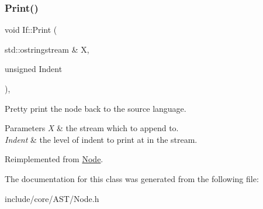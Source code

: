 \subsubsection{\texorpdfstring{Print()}{Print()}}
{\footnotesize\ttfamily void If\+::\+Print (\begin{DoxyParamCaption}\item[{std\+::ostringstream \&}]{X,  }\item[{unsigned}]{Indent }\end{DoxyParamCaption})\hspace{0.3cm}{\ttfamily [override]}, {\ttfamily [virtual]}}

Pretty print the node back to the source language. 
\begin{DoxyParams}{Parameters}
{\em X} & the stream which to append to. \\
\hline
{\em Indent} & the level of indent to print at in the stream. \\
\hline
\end{DoxyParams}


Reimplemented from \mbox{\hyperlink{class_node_a5325b760a6e6fe94227c0cff53af2c45}{Node}}.



The documentation for this class was generated from the following file\+:\begin{DoxyCompactItemize}
\item 
include/core/\+A\+S\+T/Node.\+h\end{DoxyCompactItemize}
